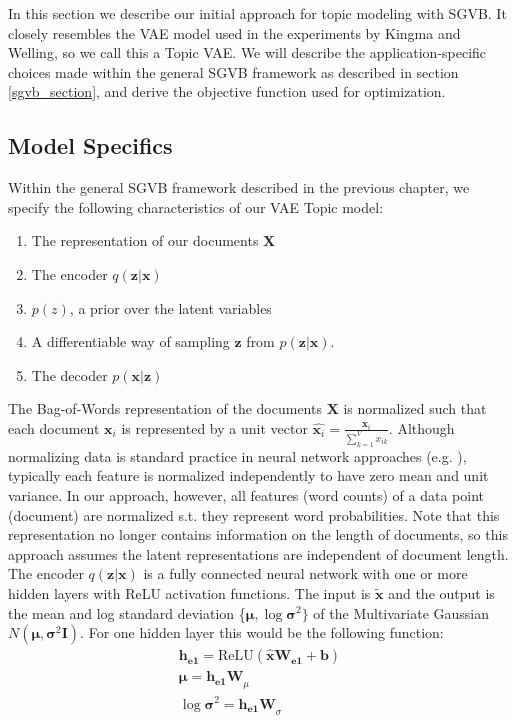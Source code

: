 \documentclass{report}
\begin{document}
In this section we describe our initial approach for topic modeling with SGVB. It closely resembles the VAE model used in the experiments by Kingma and Welling\cite{kingma2013auto}, so we call this a Topic VAE. We will describe the application-specific choices made within the general SGVB framework as described in section \ref{sgvb_section}, and derive the objective function used for optimization. 

\subsection{Model Specifics}

Within the general SGVB framework described in the previous chapter, we specify the following characteristics of our VAE Topic model:

\begin{enumerate}
	\item The representation of our documents $\mathbf{X}$
	\item The encoder $q(\mathbf{z}|\mathbf{x})$
	\item $p(z)$, a prior  over the latent variables
	\item A differentiable way of sampling $\mathbf{z}$ from $p(\mathbf{z}|\mathbf{x})$. 
	\item The decoder $p(\mathbf{x}|\mathbf{z})$
\end{enumerate}

The Bag-of-Words representation of the documents ${\mathbf{X}}$ is normalized such that each document $\mathbf{x}_i$ is represented by a unit vector $\hat{\mathbf{x}_i} = \frac{\mathbf{x}_i}{\sum_{k=1}^{V}x_{ik}}$. Although normalizing data is standard practice in neural network approaches (e.g. \cite{bishop1995neural}), typically each feature is normalized independently to have zero mean and unit variance. In our approach, however, all features (word counts) of a data point (document) are normalized s.t. they represent word probabilities.  Note that this representation no longer contains information on the length of documents, so this approach assumes the latent representations are independent of document length.
\\
The encoder $q(\mathbf{z}|\mathbf{x})$ is a fully connected neural network with one or more hidden layers with ReLU activation functions. The input is $\tilde{\mathbf{x}}$ and the output is the mean and log standard deviation \{$\boldsymbol{\mu}, \log \boldsymbol{\sigma} ^2\}$ of the Multivariate Gaussian $N(\boldsymbol{\mu}, \boldsymbol{\sigma} ^2\textbf{I})$. For one hidden layer this would be the following function:
\begin{align}
\mathbf{h_{e1}} = \text{ReLU}(\mathbf{\hat{x}}\mathbf{W_{e1}} + \mathbf{b}) \label{he1}\\
\boldsymbol{\mu} = \mathbf{h_{e1}W}_{\mu} \label{vae_encoding_mu} \\
\log \boldsymbol{\sigma}^2 = \mathbf{h_{e1}W}_{\sigma} \label{vae_encoding_sig}
\end{align} 
\end{document}
